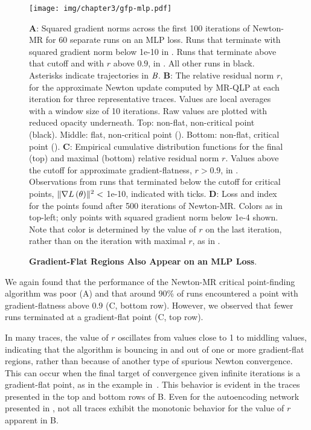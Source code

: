 \documentclass[../../thesis.tex]{subfiles}
\begin{document}
\begin{figure}[!hp]
	\begin{center}
		\texttt{[image: img/chapter3/gfp-mlp.pdf]}
	\end{center}
	\caption{\textbf{Gradient-Flat Regions Also Appear on an MLP Loss}.}{%
	\textbf{A}:
	Squared gradient norms across the first 100 iterations of Newton-MR
	for 60 separate runs on an MLP loss.
	Runs that terminate with squared gradient norm below 1e-10
	in \successcolor{}.
	Runs that terminate above that cutoff and with $r$ above $0.9$,
	in \failcolor{}.
	All other runs in black.
	Asterisks indicate trajectories in $\emph{B}$.
	\textbf{B}:
	The relative residual norm $r$,
	for the approximate Newton update
	computed by MR-QLP at each iteration
	for three representative traces.
	Values are local averages with a window size of 10 iterations.
	Raw values are plotted with reduced opacity underneath.
	Top: non-flat, non-critical point (black).
	Middle: flat, non-critical point (\failcolor{}).
	Bottom: non-flat, critical point (\successcolor{}).
	\textbf{C}:
	Empirical cumulative distribution functions for
	the final (top) and maximal (bottom) relative residual norm $r$.
	Values above the cutoff for approximate gradient-flatness, $r>0.9$,
	in \failcolor{}.
	Observations from runs that terminated below the cutoff for critical points,
	$\lVert\nabla L\left(\theta\right)\rVert^2 <$ 1e-10,
	indicated with \successcolor{} ticks.
	\textbf{D}:
	Loss and index for the points found
	after 500 iterations of Newton-MR\@.
	Colors as in top-left; only points with squared gradient norm below 1e-4 shown.
	Note that color is determined by
	the value of $r$ on the last iteration,
	rather than on the iteration with maximal $r$,
	as in .%
	}
\end{figure}

We again found that the performance of
the Newton-MR critical point-finding algorithm was poor
(A)
and that around 90\% of runs encountered a point
with gradient-flatness above $0.9$
(C, bottom row).
However, we observed that fewer runs terminated
at a gradient-flat point
(C, top row).

In many traces,
the value of $r$ oscillates from values close to 1
to middling values,
indicating that the algorithm is bouncing in and out
of one or more gradient-flat regions,
rather than because of another type of spurious Newton convergence.
This can occur when the final target of convergence
given infinite iterations
is a gradient-flat point,
as in the example in~.
This behavior is evident in the traces presented in the top and bottom rows of
B.
Even for the autoencoding network presented in ,
not all traces exhibit the monotonic behavior for the value of $r$
apparent in B.
\end{document}
